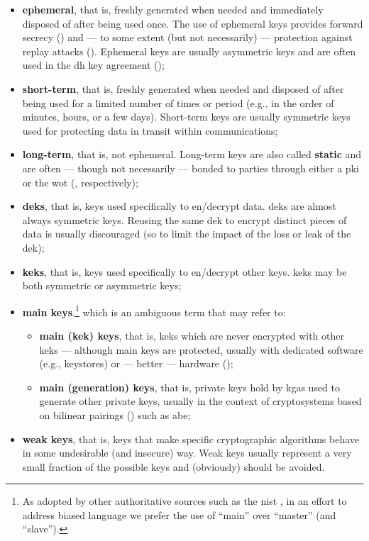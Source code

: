 \begin{itemize}
	\item \textbf{ephemeral}, that is, freshly generated when needed and immediately disposed of after being used once. The use of ephemeral keys provides forward secrecy () and --- to some extent (but not necessarily) --- protection against replay attacks (). Ephemeral keys are usually asymmetric keys and are often used in the \gls{dh} key agreement ();
	\item \textbf{short-term}, that is, freshly generated when needed and disposed of after being used for a limited number of times or period (e.g., in the order of minutes, hours, or a few days). Short-term keys are usually symmetric keys used for protecting data in transit within communications;
	\item \textbf{long-term}, that is, not ephemeral. Long-term keys are also called \textbf{static} and are often --- though not necessarily --- bonded to parties through either a \gls{pki} or the \gls{wot} (, respectively);
	\item \textbf{\glspl{dek}}, that is, keys used specifically to en/decrypt data. \glspl{dek} are almost always symmetric keys. Reusing the same \gls{dek} to encrypt distinct pieces of data is usually discouraged (so to limit the impact of the loss or leak of the \gls{dek});
	\item \textbf{\glspl{kek}}, that is, keys used specifically to en/decrypt other keys. \glspl{kek} may be both symmetric or asymmetric keys;
	\item \textbf{main keys},\footnote{As adopted by other authoritative sources such as the \gls{nist} \cite{hu_overview_2023}, in an effort to address biased language we prefer the use of ``main'' over ``master'' (and ``slave'').} which is an ambiguous term that may refer to:
	\begin{itemize}
		\item \textbf{main (\gls{kek}) keys}, that is, \glspl{kek} which are never encrypted with other \glspl{kek} --- although main keys are protected, usually with dedicated software (e.g., keystores) or --- better --- hardware ();
		\item \textbf{main (generation) keys}, that is, private keys hold by \glspl{kga} used to generate other private keys, usually in the context of cryptosystems based on bilinear pairings () such as \gls{abe};
	\end{itemize}
	\item \textbf{weak keys}, that is, keys that make specific cryptographic algorithms behave in some undesirable (and insecure) way. Weak keys usually represent a very small fraction of the possible keys and (obviously) should be avoided.
\end{itemize}

